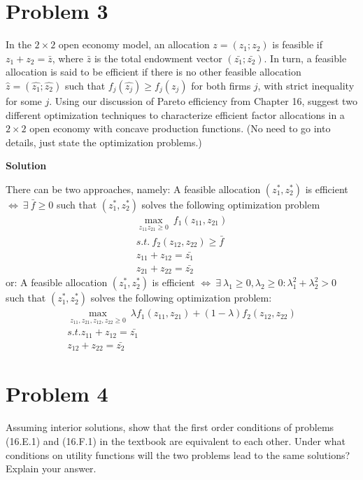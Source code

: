 \documentclass[a4paper]{article}
\begin{document}
\section*{Problem 3}
In the $2\times 2$ open economy model, an allocation $z = (z_1; z_2)$ is feasible if $z_1+z_2 = \bar{z}$, where
$\bar{z}$ is the total endowment vector $(\bar{z_1}; \bar{z_2})$. In turn, a feasible allocation is said to be efficient
if there is no other feasible allocation $\hat{z} = (\hat{z_1}; \hat{z_2})$ such that $f_j(\hat{z_j}) \ge f_j(z_j)$ for both firms $j$,
with strict inequality for some $j$. Using our discussion of Pareto efficiency from Chapter 16,
suggest two different optimization techniques to characterize efficient factor allocations in a
$2 \times 2$ open economy with concave production functions. (No need to go into details, just
state the optimization problems.)



\textbf{Solution}


There can be two approaches, namely:
A feasible allocation $(z_1^*, z_2^*)$ is efficient $\iff\ \exists\ \bar{f} \ge 0$ such that $(z_1^*, z_2^*)$ solves the following optimization problem 
\begin{align*}
\underset{z_{11} z_{21} \ge 0}{\max}\ f_1(z_{11}, z_{21})\\
s.t.\ f_2(z_{12}, z_{22}) \ge \bar{f}\\
z_{11} + z_{12} = \bar{z_1}\\
z_{21} + z_{22} = \bar{z_2}
\end{align*}
or:
A feasible allocation $(z_1^*, z_2^*)$ is efficient $\iff\ \exists\ \lambda_1 \ge 0, \lambda_2 \ge 0: \lambda_1^2 + \lambda_2^2 > 0$ such that $(z_1^*, z_2^*)$ solves the following optimization problem:
\begin{align*}
\underset{z_{11}, z_{21}, z_{12}, z_{22} \ge 0}{\max}\ \lambda f_1(z_{11}, z_{21}) + (1 - \lambda)f_2(z_{12}, z_{22})\\
s.t. z_{11} + z_{12} = \bar{z_1}\\
	z_{12} + z_{22} = \bar{z_2}
\end{align*}
\section*{Problem 4}
Assuming interior solutions, show that the first order conditions of problems (16.E.1)
and (16.F.1) in the textbook are equivalent to each other. Under what conditions on utility
functions will the two problems lead to the same solutions? Explain your answer.
\end{document}
